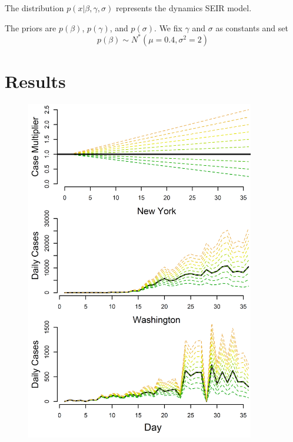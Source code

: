 \documentclass[11pt]{article}
\begin{document}
The distribution $p(x|\beta,\gamma,\sigma)$ represents the dynamics SEIR model.

The priors are $p(\beta)$, $p(\gamma)$, and $p(\sigma)$. 
We fix $\gamma$ and $\sigma$ as constants and set
\[ p(\beta) \sim N^*(\mu=0.4,\sigma^2=2) \]

\section*{Results}

\begin{figure}
\centering
\hspace*{0cm}\includegraphics[width=10cm]{cases_multilpier.png}
\caption{}
\label{fig:bends}
\end{figure} 
\end{document}
